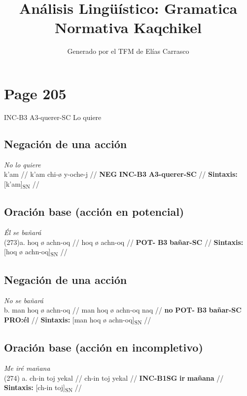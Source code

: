 \documentclass{article}%
\title{Análisis Lingüístico: Gramatica Normativa Kaqchikel}%
\author{Generado por el TFM de Elías Carrasco}%
\begin{document}
%
\normalsize%
\maketitle%
\section{Page 205}%
\label{sec:Page205}%
INC{-}B3 %
A3{-}querer{-}SC %
Lo quiere %
\subsection{Negación de una acción}%
\label{subsec:Negacindeunaaccin}%

%
\par\medskip%
\ex
\textit{No lo quiere} \\
\begingl
\gla k'am //
\glb k'am chi-ø y-oche-j //
\glc \textbf{NEG} \textbf{INC-}\textbf{B3} \textbf{A3-querer-SC} //
\glft \textbf{Sintaxis:} [k'am]\textsubscript{SN} //
\endgl
\xe
%
\medskip%
\subsection{Oración base (acción en potencial)}%
\label{subsec:Oracinbase(accinenpotencial)}%

%
\par\medskip%
\ex
\textit{Él se bañará} \\
\begingl
\gla (273)a. hoq ø achn-oq //
\glb hoq ø achn-oq //
\glc \textbf{POT-} \textbf{B3} \textbf{bañar-SC} //
\glft \textbf{Sintaxis:} [hoq ø achn-oq]\textsubscript{SN} //
\endgl
\xe
%
\medskip%
\subsection{Negación de una acción}%
\label{subsec:Negacindeunaaccin}%

%
\par\medskip%
\ex
\textit{No se bañará} \\
\begingl
\gla b. man hoq ø achn-oq //
\glb man hoq ø achn-oq naq //
\glc \textbf{no} \textbf{POT-} \textbf{B3} \textbf{bañar-SC} \textbf{PRO:él} //
\glft \textbf{Sintaxis:} [man hoq ø achn-oq]\textsubscript{SN} //
\endgl
\xe
%
\medskip%
\subsection{Oración base (acción en incompletivo)}%
\label{subsec:Oracinbase(accinenincompletivo)}%

%
\par\medskip%
\ex
\textit{Me iré mañana} \\
\begingl
\gla (274) a. ch-in toj yekal //
\glb ch-in toj yekal //
\glc \textbf{INC-B1SG} \textbf{ir} \textbf{mañana} //
\glft \textbf{Sintaxis:} [ch-in toj]\textsubscript{SN} //
\endgl
\xe
%
\medskip%
\end{document}
